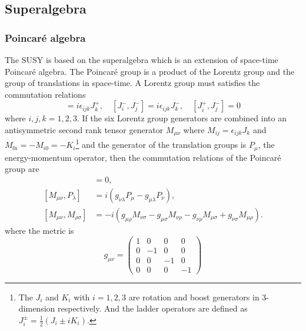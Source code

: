 
\subsection{Superalgebra}
\label{subsec:susy_superalgebra}


\subsubsection{Poincar\'{e} algebra}
\label{subsubsec:susy_poincare}
The SUSY is based on the superalgebra which is an extension of space-time Poincar\'{e} algebra.
The Poincar\'{e} group is a product of the Lorentz group and the group of translations in space-time.
A Lorentz group must satisfies the commutation relations
%
\begin{equation}
[J^{+}_{i}, J^{+}_{j}] = i \epsilon_{ijk} J^{+}_{k}, \quad 
[J^{-}_{i}, J^{-}_{j}] = i \epsilon_{ijk} J^{-}_{k}, \quad 
[J^{+}_{i}, J^{-}_{j}] = 0
\label{eq:susy_Lorentz_commutation_relations}
\end{equation}
%
where $i, j, k = 1, 2, 3$.
If the six Lorentz group generators are combined into an antisymmetric second rank tensor generator $M_{\mu\nu}$ where $M_{ij} = \epsilon_{ijk}J_{k}$ and $M_{0i} = -M_{i0} = -K_{i}$\footnote{The $J_{i}$ and $K_{i}$ with $i=1,2,3$ are rotation and boost generators in 3-dimension respectively. And the ladder operators are defined as $J_{i}^{\pm} = \frac{1}{2} (J_{i} \pm i K_{i})$.} and the generator of the translation groups is $P_{\mu}$, the energy-momentum operator, then the commutation relations of the Poincar\'{e} group are
%
\begin{align}
[P_{\mu}, P_{\nu}] &= 0 ,\\
[M_{\mu \nu}, P_{\lambda}] &= i (g_{\nu \lambda} P_{\mu} - g_{\mu \lambda} P_{\nu}) ,\\
[M_{\mu \nu}, M_{\rho \sigma}] &= -i (g_{\mu \rho} M_{\nu \sigma} - g_{\mu \sigma} M_{\nu \rho} - g_{\nu \rho} M_{\mu \sigma} + g_{\nu \sigma} M_{\mu \rho}) .
\label{eq:susy_Poincare_commutation_relations}
\end{align}
where the metric is 
\begin{equation}
g_{\mu \nu} =
\left(
\begin{array}{cccc}
1 & 0 & 0 & 0\\
0 & -1 & 0 & 0\\
0 & 0 & -1 & 0\\
0 & 0 & 0 & -1   
\end{array}
\right)
\label{eq:susy_metric}
\end{equation}
%

